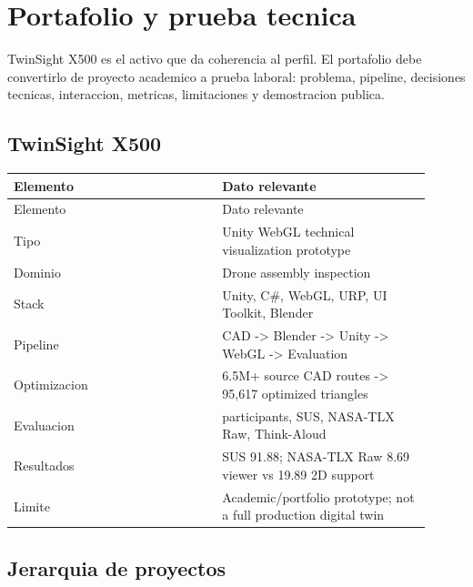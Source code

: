 \chapter{Portafolio y prueba tecnica}


TwinSight X500 es el activo que da coherencia al perfil. El portafolio debe convertirlo de proyecto academico a prueba laboral: problema, pipeline, decisiones tecnicas, interaccion, metricas, limitaciones y demostracion publica.


\section{TwinSight X500}


\begin{center}
\scriptsize
\begin{longtable}{>{\raggedright\arraybackslash}p{0.455\linewidth} >{\raggedright\arraybackslash}p{0.455\linewidth}}
\toprule
Elemento & Dato relevante \\
\midrule
\endfirsthead
\toprule
Elemento & Dato relevante \\
\midrule
\endhead
Tipo & Unity WebGL technical visualization prototype \\
Dominio & Drone assembly inspection \\
Stack & Unity, C\#, WebGL, URP, UI Toolkit, Blender \\
Pipeline & CAD -> Blender -> Unity -> WebGL -> Evaluation \\
Optimizacion & 6.5M+ source CAD routes -> 95,617 optimized triangles \\
Evaluacion & 12 participants, SUS, NASA-TLX Raw, Think-Aloud \\
Resultados & SUS 91.88; NASA-TLX Raw 8.69 viewer vs 19.89 2D support \\
Limite & Academic/portfolio prototype; not a full production digital twin \\
\bottomrule
\end{longtable}
\end{center}


\section{Jerarquia de proyectos}



